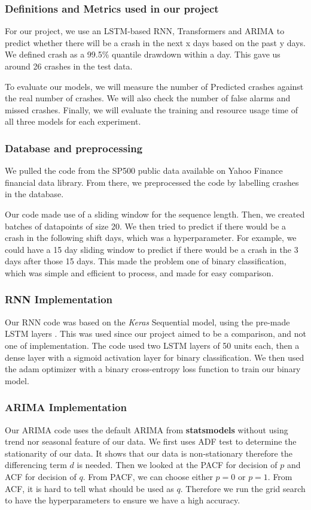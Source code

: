 \documentclass[12pt, letterpaper]{article}
\begin{document}
\subsubsection*{Definitions and Metrics used in our project}

For our project, we use an LSTM-based RNN, Transformers and ARIMA to predict whether there will be a crash in the next x days based on the past y days. We defined crash as a 99.5\% quantile drawdown within a day. This gave us around 26 crashes in the test data.

To evaluate our models, we will measure the number of Predicted crashes against the real number of crashes. We will also check the number of false alarms and missed crashes. Finally, we will evaluate the training and resource usage time of all three models for each experiment.

\subsubsection*{Database and preprocessing}

We pulled the code from the SP500 public data available on Yahoo Finance financial data library. From there, we preprocessed the code by labelling crashes in the database.

Our code made use of a sliding window for the sequence length. Then, we created batches of datapoints of size 20. We then tried to predict if there would be a crash in the following shift days, which was a hyperparameter. For example, we could have a 15 day sliding window to predict if there would be a crash in the 3 days after those 15 days. 
This made the problem one of binary classification, which was simple and efficient to process, and made for easy comparison.

\subsubsection*{RNN Implementation}

Our RNN code was based on the \textit{Keras} Sequential model, using the pre-made LSTM layers \cite{keras2024lstm,keras2024sequential}. This was used since our project aimed to be a comparison, and not one of implementation. 
The code used two LSTM layers of 50 units each, then a dense layer with a sigmoid activation layer for binary classification. We then used the adam optimizer with a binary cross-entropy loss function to train our binary model.

\subsubsection*{ARIMA Implementation}
Our ARIMA code uses the default ARIMA from \textbf{statsmodels}\cite{statsmodelsARIMA} without using trend nor seasonal feature of our data. We first uses ADF test to determine the stationarity of our data. It shows that our data is non-stationary therefore the differencing term $d$ is needed. Then we looked at the PACF for decision of $p$ and ACF for decision of $q$. From PACF, we can choose either $p=0$ or $p=1$. From ACF, it is hard to tell what should be used as $q$. Therefore we run the grid search to have the hyperparameters to ensure we have a high accuracy. 
\end{document}

